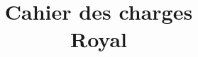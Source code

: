 \documentclass[T3]{rapport-iutrs}
\title{Cahier des charges\\Royal}
\begin{document}
\pagedegarde 

\newpage{}

\newpage{}

\tableofcontents
\newpage{}


\newpage{}


\newpage{}


\newpage{}


\newpage{}


\end{document}
